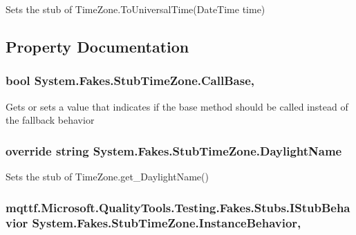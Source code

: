 Sets the stub of Time\-Zone.\-To\-Universal\-Time(\-Date\-Time time)



\subsection{Property Documentation}
\hypertarget{class_system_1_1_fakes_1_1_stub_time_zone_a6eba19bfccfa5007396bdffbac60fda4}{
\subsubsection[{Call\-Base}]{\setlength{\rightskip}{0pt plus 5cm}bool System.\-Fakes.\-Stub\-Time\-Zone.\-Call\-Base\hspace{0.3cm}{\ttfamily [get]}, {\ttfamily [set]}}}\label{class_system_1_1_fakes_1_1_stub_time_zone_a6eba19bfccfa5007396bdffbac60fda4}


Gets or sets a value that indicates if the base method should be called instead of the fallback behavior

\hypertarget{class_system_1_1_fakes_1_1_stub_time_zone_a7df0c8f8b48c3a97ae8fb6db56e2d143}{
\subsubsection[{Daylight\-Name}]{\setlength{\rightskip}{0pt plus 5cm}override string System.\-Fakes.\-Stub\-Time\-Zone.\-Daylight\-Name\hspace{0.3cm}{\ttfamily [get]}}}\label{class_system_1_1_fakes_1_1_stub_time_zone_a7df0c8f8b48c3a97ae8fb6db56e2d143}


Sets the stub of Time\-Zone.\-get\-\_\-\-Daylight\-Name()

\hypertarget{class_system_1_1_fakes_1_1_stub_time_zone_a4bc9f4095f51ce7432a38120f652a789}{
\subsubsection[{Instance\-Behavior}]{\setlength{\rightskip}{0pt plus 5cm}mqttf.\-Microsoft.\-Quality\-Tools.\-Testing.\-Fakes.\-Stubs.\-I\-Stub\-Behavior System.\-Fakes.\-Stub\-Time\-Zone.\-Instance\-Behavior\hspace{0.3cm}{\ttfamily [get]}, {\ttfamily [set]}}}\label{class_system_1_1_fakes_1_1_stub_time_zone_a4bc9f4095f51ce7432a38120f652a789}


